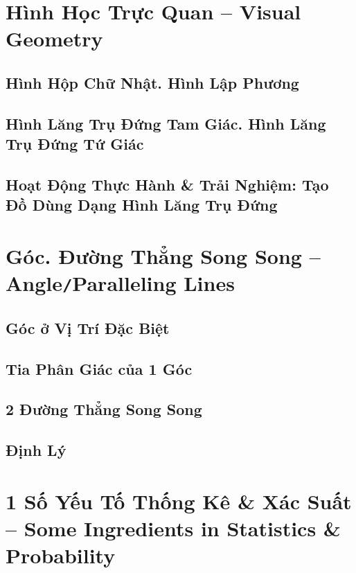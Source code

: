 \documentclass[oneside]{book}
\numberwithin{equation}{section}
\begin{document}
\chapter{Hình Học Trực Quan -- Visual Geometry}

\section{Hình Hộp Chữ Nhật. Hình Lập Phương}

\section{Hình Lăng Trụ Đứng Tam Giác. Hình Lăng Trụ Đứng Tứ Giác}

\section{Hoạt Động Thực Hành \& Trải Nghiệm: Tạo Đồ Dùng Dạng Hình Lăng Trụ Đứng}


\chapter{Góc. Đường Thẳng Song Song -- Angle\texttt{/}Paralleling Lines}

\section{Góc ở Vị Trí Đặc Biệt}

\section{Tia Phân Giác của 1 Góc}

\section{2 Đường Thẳng Song Song}

\section{Định Lý}


\chapter{1 Số Yếu Tố Thống Kê \& Xác Suất -- Some Ingredients in Statistics \& Probability}
\end{document}
